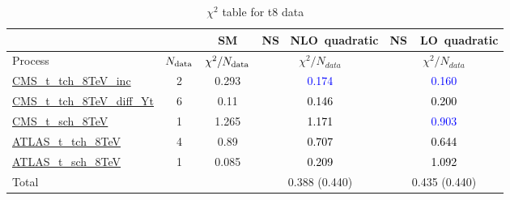 \documentclass{article}
\begin{document}
\begin{table}[H]
\centering
\begin{tabular}{|l|c|c|c|c|}
\hline
 \multicolumn{2}{|c|}{} & SM& \rm NS \ NLO\ quadratic& \rm NS\ \ LO\ quadratic\\ \hline
Process & $N_{\rm data}$ & $\chi^ 2/N_{\rm data}$& $\chi^ 2/N_{data}$& $\chi^ 2/N_{data}$\\ \hline
\href{https://arxiv.org/abs/1403.7366}{CMS_t_tch_8TeV_inc} & 2 & 0.293 & \textcolor{blue}                            {0.174} & \textcolor{blue}                            {0.160} \\ \hline
\href{https://cds.cern.ch/record/1956681}{CMS_t_tch_8TeV_diff_Yt} & 6 & 0.11 & \textcolor{black}                            {0.146} & \textcolor{black}                            {0.200} \\ \hline
\href{https://arxiv.org/abs/1603.02555}{CMS_t_sch_8TeV} & 1 & 1.265 & \textcolor{black}                            {1.171} & \textcolor{blue}                            {0.903} \\ \hline
\href{https://arxiv.org/abs/1702.02859}{ATLAS_t_tch_8TeV} & 4 & 0.89 & \textcolor{black}                            {0.707} & \textcolor{black}                            {0.644} \\ \hline
\href{https://arxiv.org/abs/1511.05980}{ATLAS_t_sch_8TeV} & 1 & 0.085 & \textcolor{black}                            {0.209} & \textcolor{black}                            {1.092} \\ \hline
\hline Total & &  & 0.388 (0.440) & 0.435 (0.440) \\ \hline
\end{tabular}
\caption{$\chi^2$ table for t8 data}
\end{table}
\end{document}
